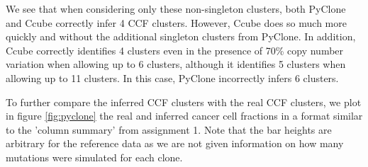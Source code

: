 \documentclass{article}
\begin{document}
We see that when considering only these non-singleton clusters, both PyClone and Ccube correctly infer 4 CCF clusters. However, Ccube does so much more quickly and without the additional singleton clusters from PyClone. In addition, Ccube correctly identifies 4 clusters even in the presence of 70\% copy number variation when allowing up to 6 clusters, although it identifies 5 clusters when allowing up to 11 clusters. In this case, PyClone incorrectly infers 6 clusters.

To further compare the inferred CCF clusters with the real CCF clusters, we plot in figure \ref{fig:pyclone} the real and inferred cancer cell fractions in a format similar to the 'column summary' from assignment 1. Note that the bar heights are arbitrary for the reference data as we are not given information on how many mutations were simulated for each clone.
\end{document}
